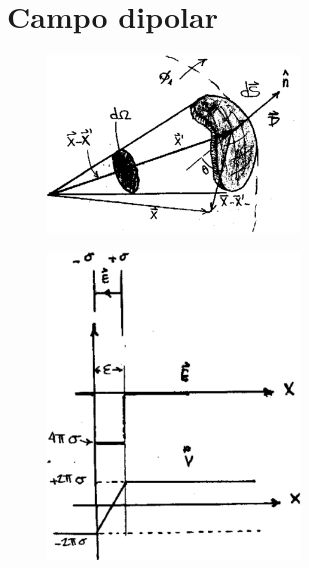\documentclass[10pt,oneside]{CBFT_book}
\begin{document}
\section{Campo dipolar}

\begin{figure}[htb]
	\begin{center}
	\includegraphics[width=0.6\textwidth]{images/fig_ft1_campo_dipolar1.pdf}	 
	\end{center}
	\caption{}
\end{figure}

\begin{figure}[htb]
	\begin{center}
	\includegraphics[width=0.6\textwidth]{images/fig_ft1_campo_dipolar2.pdf}	 
	\end{center}
	\caption{}
\end{figure}
\end{document}
